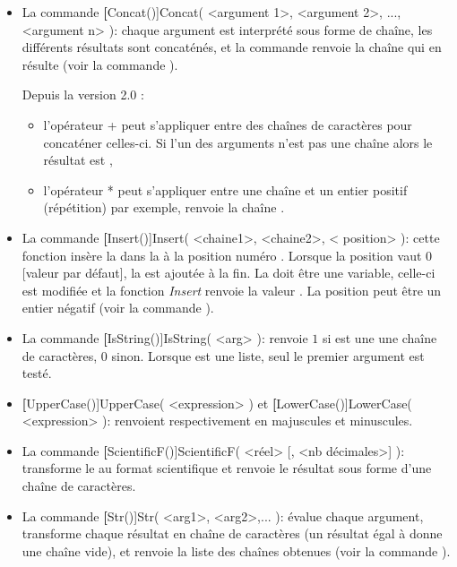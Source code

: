 \begin{itemize}

\item La commande \textbf[Concat()]{Concat( <argument 1>, <argument 2>, ..., <argument n> )}:  chaque argument est interprété sous forme de chaîne, les différents résultats sont concaténés, et la commande renvoie la chaîne qui en résulte (voir la commande ). 

Depuis la version 2.0 :
\begin{itemize}
    \item l'opérateur + peut s'appliquer entre des chaînes de caractères pour concaténer celles-ci. Si l'un des arguments n'est pas une chaîne alors le résultat est \Nil,
    \item l'opérateur * peut s'appliquer entre une chaîne et un entier positif (répétition) par exemple,  renvoie la chaîne .
\end{itemize}

\item La commande \textbf[Insert()]{Insert( <chaine1>, <chaine2>, < position> )}: cette fonction insère la  dans la  à la position numéro . Lorsque la position vaut 0 [valeur par défaut], la  est ajoutée à la fin. La  doit être une variable, celle-ci est modifiée et la fonction \textsl{Insert} renvoie la valeur \Nil. La position peut être un entier négatif (voir la commande ). 

\item La commande \textbf[IsString()]{IsString( <arg> )}: renvoie $1$ si  est une une chaîne de caractères, $0$ sinon.  Lorsque  est une liste, seul le premier argument est testé.

\item \textbf[UpperCase()]{UpperCase( <expression> )} et \textbf[LowerCase()]{LowerCase( <expression> )}: renvoient   respectivement en majuscules et minuscules.

\item La commande \textbf[ScientificF()]{ScientificF( <réel> [, <nb décimales>] )}: transforme le  au format scientifique et renvoie le résultat sous forme d'une chaîne de caractères.

\item La commande \textbf[Str()]{Str( <arg1>, <arg2>,... )}: évalue chaque argument, transforme chaque résultat en chaîne de caractères (un résultat égal à \Nil donne une chaîne vide), et renvoie la liste des chaînes obtenues (voir la commande ).


\end{itemize}
